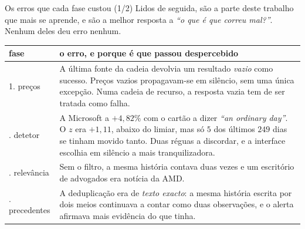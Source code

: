 \documentclass[aspectratio=169]{beamer}
\begin{document}
\begin{frame}{Os erros que cada fase custou (1/2)}
\small
Lidos de seguida, são a parte deste trabalho que mais se aprende, e são a melhor resposta a
\emph{``o que é que correu mal?''}. Nenhum deles deu erro nenhum.
\vspace{3mm}

{\scriptsize
\begin{tabular}{@{}p{}p{}@{}}
\toprule
\textbf{fase} & \textbf{o erro, e porque é que passou despercebido} \\
\midrule
1. preços & A última fonte da cadeia devolvia um resultado \emph{vazio} como sucesso. Preços
vazios propagavam-se em silêncio, sem uma única excepção. Numa cadeia de recurso, a resposta
vazia tem de ser tratada como falha. \\
\addlinespace
2. detetor & A Microsoft a $+4{,}82\%$ com o cartão a dizer \emph{``an ordinary day''}. O $z$ era
$+1{,}11$, abaixo do limiar, mas só $5$ dos últimos $249$ dias se tinham movido tanto. Duas réguas
a discordar, e a interface escolhia em silêncio a mais tranquilizadora. \\
\addlinespace
3. relevância & Sem o filtro, a mesma história contava duas vezes e um escritório de advogados
era notícia da AMD. \\
\addlinespace
5. precedentes & A deduplicação era de \emph{texto exacto}: a mesma história escrita por dois
meios continuava a contar como duas observações, e o alerta afirmava mais evidência do que
tinha. \\
\bottomrule
\end{tabular}}
\end{frame}
\end{document}
